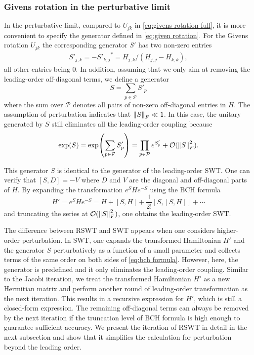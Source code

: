 \documentclass[%
 reprint,
 amsmath,amssymb,
 aps,
pra,
noeprint,
superscriptaddress,
]{revtex4-2}
\begin{document}
\subsubsection{Givens rotation in the perturbative limit}
In the perturbative limit, compared to $U_{jk}$ in \cref{eq:givens rotation full}, it is more convenient to specify the generator defined in \cref{eq:given rotation}.
For the Givens rotation $U_{jk}$ the corresponding generator $S'$ has two non-zero entries
\begin{align}
    \label{eq:compute generator}
    S'_{j,k} = - {S'_{k,j}}^* = H_{j,k}/(H_{j,j} - H_{k,k})
    ,
\end{align}
all other entries being 0.
In addition,
assuming that we only aim at removing the leading-order off-diagonal terms,
we define a generator 
\begin{equation}
    \label{eq:RSWT generator definition}
    S = \sum_{p\in\mathcal{P}} S'_{p}
\end{equation}
where the sum over $\mathcal{P}$ denotes all pairs of non-zero off-diagonal entries in $H$.
The assumption of perturbation indicates that $\norm{S}_F \ll 1$.
In this case, the unitary generated by $S$ still eliminates all the leading-order coupling because
\begin{equation}
    \label{eq:exp expansion}
    \exp(S) = \exp(\sum_{p \in \mathcal{P}} S'_{p}) = \prod_{p \in \mathcal{P}} e^{S'_{p}} + \mathcal{O}(\norm{S}_F^2)
    .
\end{equation}


This generator $S$ is identical to the generator of the leading-order SWT.
One can verify that $[S, D] = -V$ where $D$ and $V$ are the diagonal and off-diagonal parts of $H$.
By expanding the transformation $e^S H  e^{-S}$ using the BCH formula
\begin{equation}
    H' = e^S H  e^{-S} = H + [S, H] + \frac{1}{2!}[S,[S, H]] + \cdots
    \label{eq:bch formula}
\end{equation}
and truncating the series at $\mathcal{O}(\norm{S}_F^2)$, one obtains the leading-order SWT.

The difference between RSWT and SWT appears when one considers higher-order perturbation.
In SWT, one expands the transformed Hamiltonian $H'$ and the generator $S$ perturbatively as a function of a small parameter and collects terms of the same order on both sides of \cref{eq:bch formula}.
However, here, the generator is predefined and it only eliminates the leading-order coupling.
Similar to the Jacobi iteration, we treat the transformed Hamiltonian $H'$ as a new Hermitian matrix and perform another round of leading-order transformation as the next iteration.
This results in a recursive expression for $H'$, which is still a closed-form expression.
The remaining off-diagonal terms can always be removed by the next iteration if the truncation level of BCH formula is high enough to guarantee sufficient accuracy.
We present the iteration of RSWT in detail in the next subsection and show that it simplifies the calculation for perturbation beyond the leading order.
\end{document}
